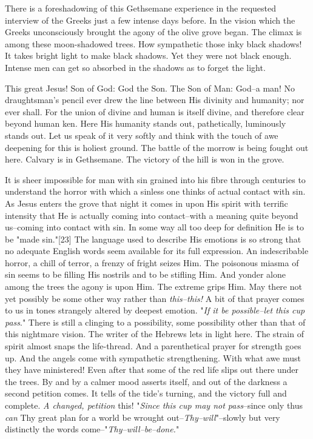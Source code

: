 There is a foreshadowing of this Gethsemane experience in the requested
interview of the Greeks just a few intense days before. In the vision
which the Greeks unconsciously brought the agony of the olive grove began.
The climax is among these moon-shadowed trees. How sympathetic those inky
black shadows! It takes bright light to make black shadows. Yet they were
not black enough. Intense men can get so absorbed in the shadows as to
forget the light.

This great Jesus! Son of God: God the Son. The Son of Man: God--a man! No
draughtsman's pencil ever drew the line between His divinity and humanity;
nor ever shall. For the union of divine and human is itself divine, and
therefore clear beyond human ken. Here His humanity stands out,
pathetically, luminously stands out. Let us speak of it very softly and
think with the touch of awe deepening for this is holiest ground. The
battle of the morrow is being fought out here. Calvary is in Gethsemane.
The victory of the hill is won in the grove.

It is sheer impossible for man with sin grained into his fibre through
centuries to understand the horror with which a sinless one thinks of
actual contact with sin. As Jesus enters the grove that night it comes in
upon His spirit with terrific intensity that He is actually coming into
contact--with a meaning quite beyond us--coming into contact with sin. In
some way all too deep for definition He is to be "made sin."[23] The
language used to describe His emotions is so strong that no adequate
English words seem available for its full expression. An indescribable
horror, a chill of terror, a frenzy of fright seizes Him. The poisonous
miasma of sin seems to be filling His nostrils and to be stifling Him. And
yonder alone among the trees the agony is upon Him. The extreme grips Him.
May there not yet possibly be some other way rather than \textit{this--this!} A
bit of that prayer comes to us in tones strangely altered by deepest
emotion. "\textit{If it be possible--let this cup pass}." There is still a
clinging to a possibility, some possibility other than that of this
nightmare vision. The writer of the Hebrews lets in light here. The strain
of spirit almost snaps the life-thread. And a parenthetical prayer for
strength goes up. And the angels come with sympathetic strengthening. With
what awe must they have ministered! Even after that some of the red life
slips out there under the trees. By and by a calmer mood asserts itself,
and out of the darkness a second petition comes. It tells of the tide's
turning, and the victory full and complete. \textit{A changed, petition} this!
"\textit{Since this cup may not pass}--since only thus \textit{can} Thy great plan for a
world be wrought out--\textit{Thy--will}"--slowly but very distinctly the words
come--"\textit{Thy--will--be--done.}"

